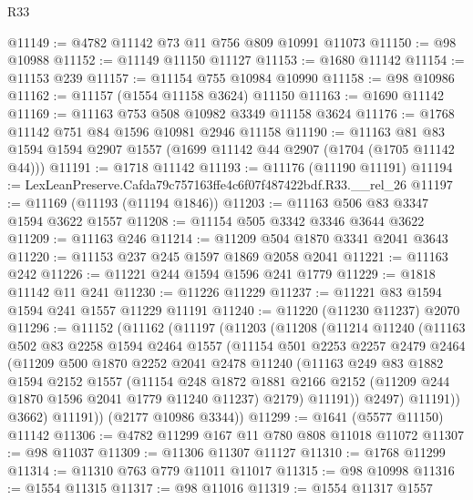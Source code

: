 \begin{lexlean}{R33}
\begin{coremodule}
@11149 := @4782 @11142 @73 @11 @756 @809 @10991 @11073
@11150 := @98 @10988
@11152 := @11149 @11150 @11127
@11153 := @1680 @11142
@11154 := @11153 @239
@11157 := @11154 @755 @10984 @10990
@11158 := @98 @10986
@11162 := @11157 (@1554 @11158 @3624) @11150
@11163 := @1690 @11142
@11169 := @11163 @753 @508 @10982 @3349 @11158 @3624
@11176 := @1768 @11142 @751 @84 @1596 @10981 @2946 @11158
@11190 := @11163 @81 @83 @1594 @1594 @2907 @1557 (@1699 @11142 @44 @2907 (@1704 (@1705 @11142 @44)))
@11191 := @1718 @11142
@11193 := @11176 (@11190 @11191)
@11194 := LexLeanPreserve.Cafda79c757163ffe4c6f07f487422bdf.R33.__rel_26
@11197 := @11169 (@11193 (@11194 @1846))
@11203 := @11163 @506 @83 @3347 @1594 @3622 @1557
@11208 := @11154 @505 @3342 @3346 @3644 @3622
@11209 := @11163 @246
@11214 := @11209 @504 @1870 @3341 @2041 @3643
@11220 := @11153 @237 @245 @1597 @1869 @2058 @2041
@11221 := @11163 @242
@11226 := @11221 @244 @1594 @1596 @241 @1779
@11229 := @1818 @11142 @11 @241
@11230 := @11226 @11229
@11237 := @11221 @83 @1594 @1594 @241 @1557 @11229 @11191
@11240 := @11220 (@11230 @11237) @2070
@11296 := @11152
    (@11162
      (@11197
        (@11203
          (@11208
            (@11214
              @11240
              (@11163
                @502
                @83
                @2258
                @1594
                @2464
                @1557
                (@11154
                  @501
                  @2253
                  @2257
                  @2479
                  @2464
                  (@11209
                    @500
                    @1870
                    @2252
                    @2041
                    @2478
                    @11240
                    (@11163
                      @249
                      @83
                      @1882
                      @1594
                      @2152
                      @1557
                      (@11154
                        @248
                        @1872
                        @1881
                        @2166
                        @2152
                        (@11209 @244 @1870 @1596 @2041 @1779 @11240 @11237)
                        @2179)
                      @11191))
                  @2497)
                @11191))
            @3662)
          @11191))
      (@2177 @10986 @3344))
@11299 := @1641 (@5577 @11150) @11142
@11306 := @4782 @11299 @167 @11 @780 @808 @11018 @11072
@11307 := @98 @11037
@11309 := @11306 @11307 @11127
@11310 := @1768 @11299
@11314 := @11310 @763 @779 @11011 @11017
@11315 := @98 @10998
@11316 := @1554 @11315
@11317 := @98 @11016
@11319 := @1554 @11317 @1557

\end{coremodule}
\end{lexlean}
